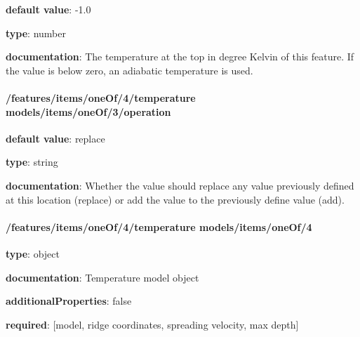 \begin{itemized}
\item {\bf default value}: -1.0
\item {\bf type}: number
\item {\bf documentation}: The temperature at the top in degree Kelvin of this feature. If the value is below zero, an adiabatic temperature is used.
\end{itemized}\paragraph{/features/items/oneOf/4/temperature models/items/oneOf/3/operation} \begin{itemized}
\item {\bf default value}: replace
\item {\bf type}: string
\item {\bf documentation}: Whether the value should replace any value previously defined at this location (replace) or add the value to the previously define value (add).
\end{itemized}\paragraph{/features/items/oneOf/4/temperature models/items/oneOf/4} \begin{itemized}
\item {\bf type}: object
\item {\bf documentation}: Temperature model object
\item {\bf additionalProperties}: false
\item {\bf required}: [model, ridge coordinates, spreading velocity, max depth]\end{itemized}
